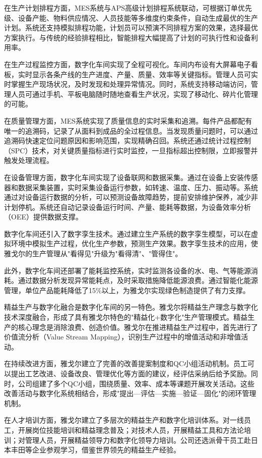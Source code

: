 \documentclass[12pt,a4paper]{article}
\begin{document}
在生产计划排程方面，MES系统与APS高级计划排程系统联动，可根据订单优先级、设备产能、物料供应情况、人员技能等多维度约束条件，自动生成最优的生产计划。系统还支持模拟排程功能，计划员可以预演不同排程方案的效果，选择最优方案执行。与传统的经验排程相比，智能排程大幅提高了计划的可执行性和设备利用率。

在生产过程监控方面，数字化车间实现了全程可视化。车间内布设有大屏幕电子看板，实时显示各条产线的生产进度、产量、质量、效率等关键指标。管理人员可实时掌握生产现场状况，及时发现和处理异常情况。同时，系统支持移动端访问，管理人员可通过手机、平板电脑随时随地查看生产状况，实现了移动化、碎片化管理的可能。

在质量管理方面，MES系统实现了质量信息的实时采集和追溯。每件产品都配有唯一的追溯码，记录了从面料到成品的全过程信息。当发现质量问题时，可以通过追溯码快速定位问题原因和影响范围，实现精确召回。系统还通过统计过程控制（SPC）技术，对关键质量指标进行实时监控，一旦指标超出控制限，立即报警并触发处理流程。

在设备管理方面，数字化车间实现了设备联网和数据采集。通过在设备上安装传感器和数据采集装置，实时采集设备运行参数，如转速、温度、压力、振动等。系统通过对设备运行数据的分析，可以预测设备故障趋势，提前安排维护保养，减少非计划停机。系统还自动记录设备运行时间、产量、能耗等数据，为设备效率分析（OEE）提供数据支撑。

数字化车间还引入了数字孪生技术。通过建立生产系统的数字孪生模型，可以在虚拟环境中模拟生产过程，优化生产参数，预测生产效果。数字孪生技术的应用，使雅戈尔的生产管理从"看得见"升级为"看得清"、"管得住"。

此外，数字化车间还部署了能耗监控系统，实时监测各设备的水、电、气等能源消耗。通过数据分析发现异常能耗点，及时采取措施降低能源浪费。通过智能化能源管理，单位产品能耗降低了15\%以上，为雅戈尔实现绿色制造提供了有力支撑。

精益生产与数字化融合是数字化车间的另一特色。雅戈尔将精益生产理念与数字化技术深度融合，形成了具有雅戈尔特色的"精益化+数字化"生产管理模式。精益生产的核心理念是消除浪费、创造价值。雅戈尔在推进精益生产过程中，首先进行了价值流分析（Value Stream Mapping），识别生产过程中的增值活动和非增值活动。

在持续改进方面，雅戈尔建立了完善的改善提案制度和QC小组活动机制。员工可以提出工艺改进、设备改良、管理优化等方面的建议，经评估采纳后给予奖励。同时，公司组建了多个QC小组，围绕质量、效率、成本等课题开展攻关活动。这些改善活动与数字化系统相结合，形成"提出—评估—实施—验证—固化"的闭环管理机制。

在人才培训方面，雅戈尔建立了多层次的精益生产和数字化培训体系。对一线员工，开展岗位技能培训和精益理念普及；对技术人员，开展精益工具和方法论培训；对管理人员，开展精益领导力和数字化领导力培训。公司还选派骨干员工赴日本丰田等企业参观学习，借鉴世界领先的精益生产经验。
\end{document}
